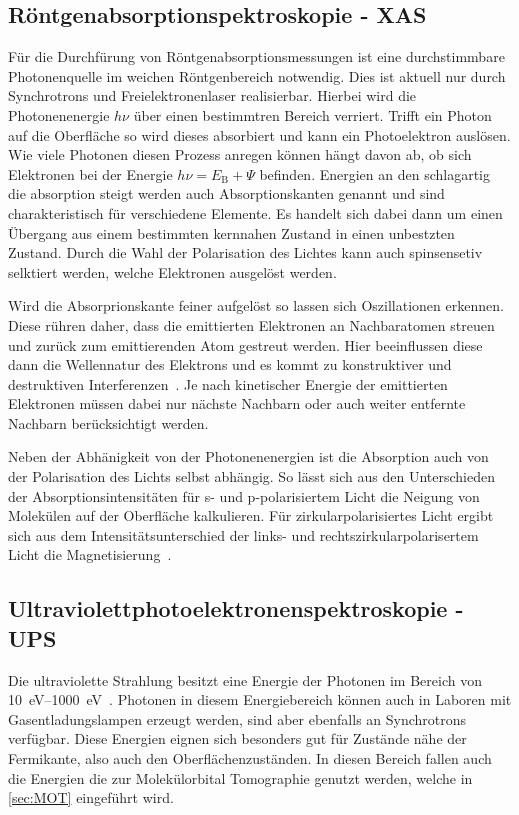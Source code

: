         \subsection{Röntgenabsorptionspektroskopie - XAS}
            Für die Durchfürung von Röntgenabsorptionsmessungen ist eine durchstimmbare Photonenquelle im weichen Röntgenbereich notwendig.
            Dies ist aktuell nur durch Synchrotrons und Freielektronenlaser realisierbar.
            Hierbei wird die Photonenenergie $h\nu$ über einen bestimmtren Bereich verriert. %
            Trifft ein Photon auf die Oberfläche so wird dieses absorbiert und kann ein Photoelektron auslösen.
            Wie viele Photonen diesen Prozess anregen können hängt davon ab, ob sich Elektronen bei der Energie $h\nu = E_\text{B}+\Psi$ befinden.
            Energien an den schlagartig die absorption steigt werden auch Absorptionskanten genannt und sind charakteristisch für verschiedene Elemente. 
            Es handelt sich dabei dann um einen Übergang aus einem bestimmten kernnahen Zustand in einen unbestzten Zustand.
            Durch die Wahl der Polarisation des Lichtes kann auch spinsensetiv selktiert werden, welche Elektronen ausgelöst werden.

            Wird die Absorprionskante feiner aufgelöst so lassen sich Oszillationen erkennen.
            Diese rühren daher, dass die emittierten Elektronen an Nachbaratomen streuen und zurück zum emittierenden Atom gestreut werden.
            Hier beeinflussen diese dann die Wellennatur des Elektrons und es kommt zu konstruktiver und destruktiven Interferenzen~\cite{Fauster}.
            Je nach kinetischer Energie der emittierten Elektronen müssen dabei nur nächste Nachbarn oder auch weiter entfernte Nachbarn berücksichtigt werden.
            
            Neben der Abhänigkeit von der Photonenenergien ist die Absorption auch von der Polarisation des Lichts selbst abhängig.
            So lässt sich aus den Unterschieden der Absorptionsintensitäten für s- und p-polarisiertem Licht die Neigung von Molekülen auf der Oberfläche kalkulieren\cite{floreano_periodic_2008}.
            Für zirkularpolarisiertes Licht ergibt sich aus dem Intensitätsunterschied der links- und rechtszirkularpolarisertem Licht die Magnetisierung~\cite{stohr_magnetism_2006}.

        \subsection{Ultraviolettphotoelektronenspektroskopie - UPS} \label{sec:UPS}
            Die ultraviolette Strahlung besitzt eine Energie der Photonen im Bereich von \SIrange{10}{1000}{\electronvolt}~\cite{Fauster}.
            Photonen in diesem Energiebereich können auch in Laboren mit Gasentladungslampen erzeugt werden, sind aber ebenfalls an Synchrotrons verfügbar.
            Diese Energien eignen sich besonders gut für Zustände nähe der Fermikante, also auch den Oberflächenzuständen.
            In diesen Bereich fallen auch die Energien die zur Molekülorbital Tomographie genutzt werden, welche in \autoref{sec:MOT} eingeführt wird.

